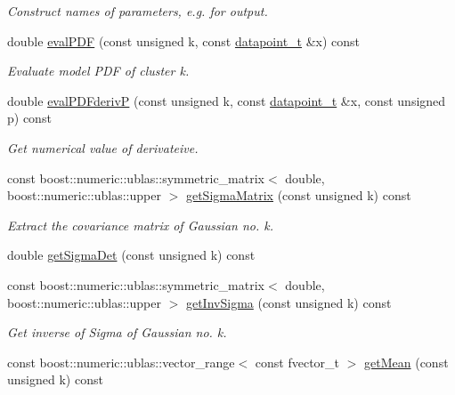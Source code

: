 \begin{DoxyCompactItemize}
\begin{DoxyCompactList}\small\item\em Construct names of parameters, e.g. for output. \item\end{DoxyCompactList}\item 
double \hyperlink{classCDA_1_1GaussianMixtureModel_ad89163c9bc3bdd8565a1fdcd9206d762}{evalPDF} (const unsigned k, const \hyperlink{classCDA_1_1EMGenericMixtureModelCore_a59c8aa9101530e99b1392d848fd50357}{datapoint\_\-t} \&x) const 
\begin{DoxyCompactList}\small\item\em Evaluate model PDF of cluster k. \item\end{DoxyCompactList}\item 
double \hyperlink{classCDA_1_1GaussianMixtureModel_a5f05d1d0815a3ba669d442bb560711df}{evalPDFderivP} (const unsigned k, const \hyperlink{classCDA_1_1EMGenericMixtureModelCore_a59c8aa9101530e99b1392d848fd50357}{datapoint\_\-t} \&x, const unsigned p) const 
\begin{DoxyCompactList}\small\item\em Get numerical value of derivateive. \item\end{DoxyCompactList}\item 
const boost::numeric::ublas::symmetric\_\-matrix$<$ double, boost::numeric::ublas::upper $>$ \hyperlink{classCDA_1_1GaussianMixtureModel_a0950a8909e82521c0919f337d18dbe04}{getSigmaMatrix} (const unsigned k) const 
\begin{DoxyCompactList}\small\item\em Extract the covariance matrix of Gaussian no. k. \item\end{DoxyCompactList}\item 
double \hyperlink{classCDA_1_1GaussianMixtureModel_a65065aeca55fef7931c83911ca656a3b}{getSigmaDet} (const unsigned k) const 
\item 
\hypertarget{classCDA_1_1GaussianMixtureModel_a89678e8fbc1e6361ff13c68def11b548}{
const boost::numeric::ublas::symmetric\_\-matrix$<$ double, boost::numeric::ublas::upper $>$ \hyperlink{classCDA_1_1GaussianMixtureModel_a89678e8fbc1e6361ff13c68def11b548}{getInvSigma} (const unsigned k) const }
\label{classCDA_1_1GaussianMixtureModel_a89678e8fbc1e6361ff13c68def11b548}

\begin{DoxyCompactList}\small\item\em Get inverse of Sigma of Gaussian no. k. \item\end{DoxyCompactList}\item 
\hypertarget{classCDA_1_1GaussianMixtureModel_a46342603d7c1d04354bdbf7664655cd4}{
const boost::numeric::ublas::vector\_\-range$<$ const fvector\_\-t $>$ \hyperlink{classCDA_1_1GaussianMixtureModel_a46342603d7c1d04354bdbf7664655cd4}{getMean} (const unsigned k) const }
\label{classCDA_1_1GaussianMixtureModel_a46342603d7c1d04354bdbf7664655cd4}


\end{DoxyCompactItemize}

